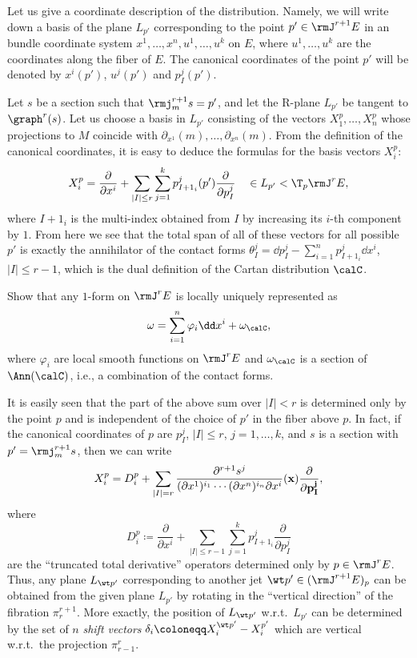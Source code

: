 Let us give a coordinate description of the distribution. Namely, we will write down a basis of the plane $L_{p'}$ corresponding to the point $p'\in \rmJ^{r+1}E$ in an bundle coordinate system $x^1,\ldots,x^n,u^1,\ldots,u^k$ on $E$, where $u^1,\ldots,u^k$ are the coordinates along the fiber of $E$. The canonical coordinates of the point $p'$ will be denoted by $x^i(p')$, $u^j(p')$ and $p^j_I(p')$.

Let $s$ be a section such that $\rmj^{r+1}_m s=p'$, and let the R-plane $L_{p'}$ be tangent to $\graph^r(s)$. Let us choose a basis in $L_{p'}$ consisting of the vectors $X_1^p,\ldots,X_n^p$ whose projections to $M$ coincide with $\partial_{x^1}(m),\ldots,\partial_{x^n}(m)$. From the definition of the canonical coordinates, it is easy to deduce the formulas for the basis vectors $X^p_i$:
\[X^p_i=\frac{\partial}{\partial x^i}+\sum_{|I|\leq r}\sum_{j=1}^k p^j_{I+1_i}(p')\frac{\partial}{\partial p^j_I}\quad \in L_{p'}<\T_p \rmJ^rE,\]
where $I+1_i$ is the multi-index obtained from $I$ by increasing its $i$-th component by $1$. From here we see that the total span of all of these vectors for all possible $p'$ is exactly the annihilator of the contact forms $\theta_I^j=\dd p^j_I-\sum_{i=1}^n p^j_{I+1_i}\dd x^i$, $|I|\leq r-1$, which is the dual definition of the Cartan distribution $\calC$.

\begin{xca}\label{ex 3.3.6 Kras}
    Show that any $1$-form on $\rmJ^rE$ is locally uniquely represented as 
    \[\omega=\sum_{i=1}^n \varphi_i \dd x^i+\omega_\calC,\]
    where $\varphi_i$ are local smooth functions on $\rmJ^rE$ and $\omega_\calC$ is a section of $\Ann(\calC)$, i.e., a combination of the contact forms.
\end{xca}

It is easily seen that the part of the above sum over $|I|<r$ is determined only by the point $p$ and is independent of the choice of $p'$ in the fiber above $p$. In fact, if the canonical coordinates of $p$ are $p^j_I$, $|I|\leq r$, $j=1,\ldots,k$, and $s$ is a section with $p'=\rmj^{r+1}_m s$, then we can write 
\[X^p_i=D_i^p+\sum_{|I|=r}\frac{\partial^{r+1}s^j}{(\partial x^1)^{i_1}\cdots (\partial x^n)^{i_n}\partial x^i}(\bf{x})\frac{\partial}{\partial p^j_I},\]
where 
\[D_i^p\coloneqq \frac{\partial}{\partial x^i}+\sum_{|I|\leq r-1}\sum_{j=1}^k p^j_{I+1_i}\frac{\partial}{\partial p^j_I}\]
are the ``truncated total derivative'' operators determined only by $p\in \rmJ^rE$. Thus, any plane $L_{\wt p'}$ corresponding to another jet $\wt p'\in (\rmJ^{r+1}E)_p$ can be obtained from the given plane $L_{p'}$ by rotating in the ``vertical direction'' of the fibration $\pi^{r+1}_r$. More exactly, the position of $L_{\wt p'}$ w.r.t.\ $L_{p'}$ can be determined by the set of $n$ \emph{shift vectors} $\delta_i\coloneqq X^{\wt p'}_i-X^{p'}_i$ which are vertical w.r.t.\ the projection $\pi^r_{r-1}$.

